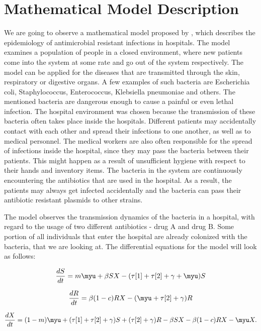 \chapter*{Mathematical Model Description}


We are going to observe a mathematical model proposed by \cite{lips}, which describes the epidemiology of antimicrobial resistant infections in hospitals. The model examines a population of people in a closed environment, where new patients come into the system at some rate and go out of the system respectively. The model can be applied for the diseases that are transmitted through the skin, respiratory or digestive organs. A few examples of such bacteria are Escherichia coli, Staphylococcus, Enterococcus, Klebsiella pneumoniae and others. The mentioned bacteria are dangerous enough to cause a painful or even lethal infection. The hospital environment was chosen because the transmission of these bacteria often takes place inside the hospitals. Different patients may accidentally contact with each other and spread their infections to one another, as well as to medical personnel. The medical workers are also often responsible for the spread of infections inside the hospital, since they may pass the bacteria between their patients. This might happen as a result of unsufficient hygiene with respect to their hands and inventory items. The bacteria in the system are continuously encountering the antibiotics that are used in the hospital. As a result, the patients may always get infected accidentally and the bacteria can pass their antibiotic resistant plasmids to other strains.

The model observes the transmission dynamics of the bacteria in a hospital, with regard to the usage of two different antibiotics - drug A and drug B. Some portion of all individuals that enter the hospital are already colonized with the bacteria, that we are looking at. The differential equations for the model will look as follows:

\begin{equation}
\frac{dS}{dt} = m \myu + \beta S X - (\tau[1] + \tau[2] + \gamma + \myu) S
\end{equation}

\begin{equation}
\frac{dR}{dt} = \beta (1 - c) R X - (\myu + \tau[2] + \gamma) R
\end{equation}

\begin{equation}
\frac{dX}{dt} = (1 - m) \myu + (\tau[1] + \tau[2] + \gamma) S + (\tau[2] + \gamma) R - \beta S X - \beta (1-c) R X - \myu X.
\end{equation}